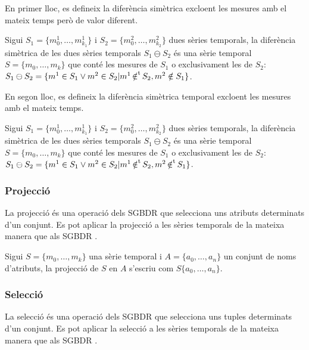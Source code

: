 En primer lloc, es defineix la diferència simètrica excloent les
mesures amb el mateix temps però de valor diferent.
\begin{definition}
  Sigui $S_1=\{m_0^1, \dotsc, m_{k_1}^1\}$ i $S_2=\{m_0^2, \dotsc,
  m_{k_2}^2\}$ dues sèries temporals, la diferència simètrica de les
  dues sèries temporals $S_1 \ominus S_2$ és una sèrie temporal
  $S=\{m_0, \dotsc, m_k\}$ que conté les mesures de $S_1$ o
  exclusivament les de $S_2$: $S_1 \ominus S_2 = \{ m^1 \in S_1 \vee
  m^2 \in S_2 | m^1 \operatorname*{\notin^t} S_2, m^2 \notin S_1 \}$.
\end{definition}

En segon lloc, es defineix la diferència simètrica temporal excloent les
mesures amb el mateix temps.
\begin{definition}
  Sigui $S_1=\{m_0^1, \dotsc, m_{k_1}^1\}$ i $S_2=\{m_0^2, \dotsc,
  m_{k_2}^2\}$ dues sèries temporals, la diferència simètrica de les
  dues sèries temporals $S_1 \ominus S_2$ és una sèrie temporal
  $S=\{m_0, \dotsc, m_k\}$ que conté les mesures de $S_1$ o
  exclusivament les de $S_2$: $S_1 \ominus S_2 = \{ m^1 \in S_1 \vee
  m^2 \in S_2 | m^1 \operatorname*{\notin^t} S_2, m^2 \operatorname*{\notin^t} S_1 \}$.
\end{definition}



\subsubsection{Projecció}

La projecció és una operació dels SGBDR que selecciona uns atributs
determinats d'un conjunt. Es pot aplicar la projecció a les sèries
temporals de la mateixa manera que als
SGBDR \parencite{date:introduction}. 

Sigui $S =\{m_0, \dotsc, m_k\}$ una sèrie temporal i $A=\{a_0, \dotsc,
a_n\}$ un conjunt de noms d'atributs, la projecció de $S$ en $A$
s'escriu com $S\{a_0, \dotsc, a_n\}$.




\subsubsection{Selecció}

La selecció és una operació dels SGBDR que selecciona uns tuples
determinats d'un conjunt. Es pot aplicar la selecció a les sèries
temporals de la mateixa manera que als
SGBDR \parencite{date:introduction}. 

